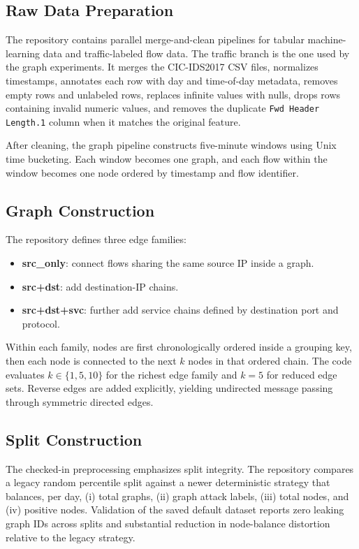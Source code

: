 \documentclass[conference]{IEEEtran}
\begin{document}
\subsection{Raw Data Preparation}
The repository contains parallel merge-and-clean pipelines for tabular machine-learning data and traffic-labeled flow data. The traffic branch is the one used by the graph experiments. It merges the CIC-IDS2017 CSV files, normalizes timestamps, annotates each row with day and time-of-day metadata, removes empty rows and unlabeled rows, replaces infinite values with nulls, drops rows containing invalid numeric values, and removes the duplicate \texttt{Fwd Header Length.1} column when it matches the original feature.

After cleaning, the graph pipeline constructs five-minute windows using Unix time bucketing. Each window becomes one graph, and each flow within the window becomes one node ordered by timestamp and flow identifier.

\subsection{Graph Construction}
The repository defines three edge families:
\begin{itemize}
\item \textbf{src\_only}: connect flows sharing the same source IP inside a graph.
\item \textbf{src+dst}: add destination-IP chains.
\item \textbf{src+dst+svc}: further add service chains defined by destination port and protocol.
\end{itemize}

Within each family, nodes are first chronologically ordered inside a grouping key, then each node is connected to the next $k$ nodes in that ordered chain. The code evaluates $k \in \{1, 5, 10\}$ for the richest edge family and $k=5$ for reduced edge sets. Reverse edges are added explicitly, yielding undirected message passing through symmetric directed edges.

\subsection{Split Construction}
The checked-in preprocessing emphasizes split integrity. The repository compares a legacy random percentile split against a newer deterministic strategy that balances, per day, (i) total graphs, (ii) graph attack labels, (iii) total nodes, and (iv) positive nodes. Validation of the saved default dataset reports zero leaking graph IDs across splits and substantial reduction in node-balance distortion relative to the legacy strategy.
\end{document}
